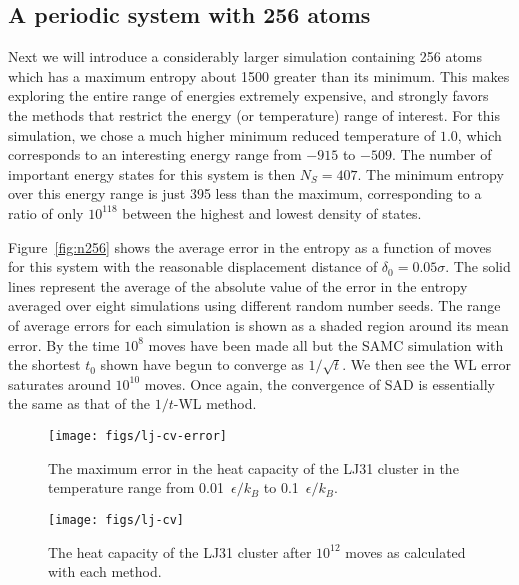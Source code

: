 \documentclass[letterpaper,twocolumn,amsmath,amssymb,pre,aps,10pt]{revtex4-1}
\begin{document}
\subsection{A periodic system with 256 atoms}
Next we will introduce a considerably larger simulation containing 256
atoms which has a maximum entropy about 1500 greater than its minimum.
This makes exploring the entire range of energies extremely expensive,
and strongly favors the methods that restrict the energy (or
temperature) range of interest.  For this simulation, we chose a much
higher minimum reduced temperature of $1.0$, which corresponds to an
interesting energy range from $-915$ to $-509$.  The number of
important energy states for this system is then $N_S = 407$.  The
minimum entropy over this energy range is just 395 less than the
maximum, corresponding to a ratio of only $10^{118}$ between the
highest and lowest density of states.


Figure~\ref{fig:n256} shows the average error in the entropy as a
function of moves for this system with the reasonable displacement
distance of $\delta_0 = 0.05\sigma$.  The solid lines represent the
average of the absolute value of the error in the entropy averaged
over eight simulations using different random number seeds.  The range
of average errors for each simulation is shown as a shaded region
around its mean error.  By the time $10^8$ moves have been made all
but the SAMC simulation with the shortest $t_0$ shown have begun to
converge as $1/\sqrt{t}$.  We then see the WL error saturates around
$10^{10}$ moves.  Once again, the convergence of SAD is essentially
the same as that of the $1/t$-WL method.

\begin{figure}
  \texttt{[image: figs/lj-cv-error]}
  \caption{The maximum error in the heat capacity of the LJ31 cluster
    in the temperature range from 0.01~$\epsilon/k_B$ to
    0.1~$\epsilon/k_B$.}
  \label{fig:lj-cv-error}
\end{figure}

\begin{figure}
  \texttt{[image: figs/lj-cv]}
  \caption{The heat capacity of the LJ31 cluster after $10^{12}$ moves
    as calculated with each method.}
  \label{fig:lj-cv}
\end{figure}
\end{document}
